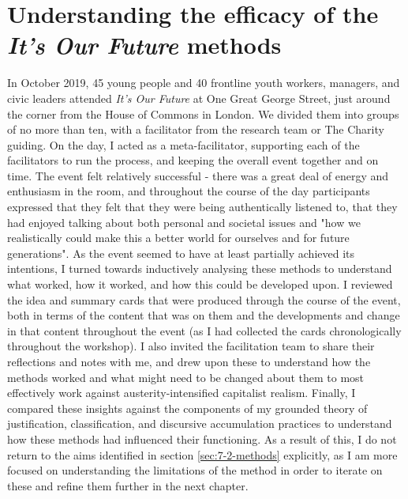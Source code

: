\section{Understanding the efficacy of the \textit{It's Our Future} methods}
\label{sec:7-6-understanding}
In October 2019, 45 young people and 40 frontline youth workers, managers, and civic leaders attended \textit{It's Our Future} at One Great George Street, just around the corner from the House of Commons in London. We divided them into groups of no more than ten, with a facilitator from the research team or The Charity guiding. On the day, I acted as a meta-facilitator, supporting each of the facilitators to run the process, and keeping the overall event together and on time. The event felt relatively successful - there was a great deal of energy and enthusiasm in the room, and throughout the course of the day participants expressed that they felt that they were being authentically listened to, that they had enjoyed talking about both personal and societal issues and "how we realistically could make this a better world for ourselves and for future generations". As the event seemed to have at least partially achieved its intentions, I turned towards inductively analysing these methods to understand what worked, how it worked, and how this could be developed upon. I reviewed the idea and summary cards that were produced through the course of the event, both in terms of the content that was on them and the developments and change in that content throughout the event (as I had collected the cards chronologically throughout the workshop). I also invited the facilitation team to share their reflections and notes with me, and drew upon these to understand how the methods worked and what might need to be changed about them to most effectively work against austerity-intensified capitalist realism. Finally, I compared these insights against the components of my grounded theory of justification, classification, and discursive accumulation practices to understand how these methods had influenced their functioning. As a result of this, I do not return to the aims identified in section \ref{sec:7-2-methods} explicitly, as I am more focused on understanding the limitations of the method in order to iterate on these and refine them further in the next chapter.


